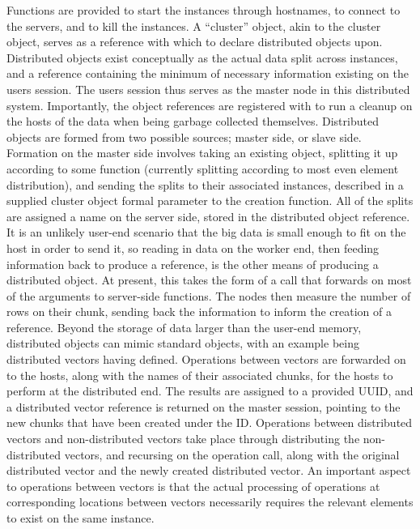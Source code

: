 Functions are provided to start the instances through hostnames, to connect to the servers, and to kill the instances.
A ``cluster'' object, akin to the  cluster object, serves as a reference with which to declare distributed objects upon.
Distributed objects exist conceptually as the actual data split across  instances, and a reference containing the minimum of necessary information existing on the users \R{} session.
The users \R{} session thus serves as the master node in this distributed system.
Importantly, the object references are registered with  to run a cleanup on the hosts of the data when being garbage collected themselves.
Distributed objects are formed from two possible sources; master side, or slave side.
Formation on the master side involves taking an existing \R{} object, splitting it up according to some function (currently splitting according to most even element distribution), and sending the splits to their associated  instances, described in a supplied cluster object formal parameter to the creation function.
All of the splits are assigned a name on the server side, stored in the distributed object reference.
It is an unlikely user-end scenario that the big data is small enough to fit on the host in order to send it, so reading in data on the worker end, then feeding information back to produce a reference, is the other means of producing a distributed object.
At present, this takes the form of a  call that forwards on most of the arguments to server-side  functions.
The nodes then measure the number of rows on their chunk, sending back the information to inform the creation of a reference.
Beyond the storage of data larger than the user-end memory, distributed objects can mimic standard \R{} objects, with an example being distributed vectors having  defined.
Operations between vectors are forwarded on to the hosts, along with the names of their associated chunks, for the hosts to perform at the distributed end.
The results are assigned to a provided UUID, and a distributed vector reference is returned on the master session, pointing to the new chunks that have been created under the ID.
Operations between distributed vectors and non-distributed vectors take place through distributing the non-distributed vectors, and recursing on the operation call, along with the original distributed vector and the newly created distributed vector.
An important aspect to operations between vectors is that the actual processing of operations at corresponding locations between vectors necessarily requires the relevant elements to exist on the same  instance.
